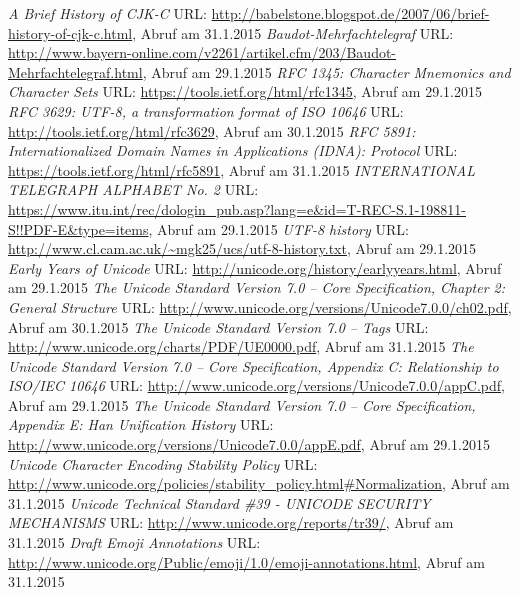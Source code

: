 \begin{thebibliography}{}
	 {\sl A Brief History of CJK-C} URL: \url{http://babelstone.blogspot.de/2007/06/brief-history-of-cjk-c.html}, Abruf am 31.1.2015
	 {\sl Baudot-Mehrfachtelegraf} URL: \url{http://www.bayern-online.com/v2261/artikel.cfm/203/Baudot-Mehrfachtelegraf.html}, Abruf am 29.1.2015
	 {\sl RFC 1345: Character Mnemonics and Character Sets} URL: \url{https://tools.ietf.org/html/rfc1345}, Abruf am 29.1.2015
	 {\sl RFC 3629: UTF-8, a transformation format of ISO 10646} URL: \url{http://tools.ietf.org/html/rfc3629}, Abruf am 30.1.2015
	 {\sl RFC 5891: Internationalized Domain Names in Applications (IDNA): Protocol} URL: \url{https://tools.ietf.org/html/rfc5891}, Abruf am 31.1.2015
	 {\sl INTERNATIONAL TELEGRAPH ALPHABET No. 2} URL: \url{https://www.itu.int/rec/dologin_pub.asp?lang=e&id=T-REC-S.1-198811-S!!PDF-E&type=items}, Abruf am 29.1.2015
	 {\sl UTF-8 history} URL: \url{http://www.cl.cam.ac.uk/~mgk25/ucs/utf-8-history.txt}, Abruf am 29.1.2015
	 {\sl Early Years of Unicode} URL: \url{http://unicode.org/history/earlyyears.html}, Abruf am 29.1.2015
	 {\sl The Unicode Standard Version 7.0 – Core Specification, Chapter 2: General Structure} URL: \url{http://www.unicode.org/versions/Unicode7.0.0/ch02.pdf}, Abruf am 30.1.2015
	 {\sl The Unicode Standard Version 7.0 – Tags} URL: \url{http://www.unicode.org/charts/PDF/UE0000.pdf}, Abruf am 31.1.2015
	 {\sl The Unicode Standard Version 7.0 – Core Specification, Appendix C: Relationship to ISO/IEC 10646} URL: \url{http://www.unicode.org/versions/Unicode7.0.0/appC.pdf}, Abruf am 29.1.2015
	 {\sl The Unicode Standard Version 7.0 – Core Specification, Appendix E: Han Unification History} URL: \url{http://www.unicode.org/versions/Unicode7.0.0/appE.pdf}, Abruf am 29.1.2015
	 {\sl Unicode Character Encoding Stability Policy} URL: \url{http://www.unicode.org/policies/stability_policy.html#Normalization}, Abruf am 31.1.2015
	 {\sl Unicode Technical Standard \#39 - UNICODE SECURITY MECHANISMS} URL: \url{http://www.unicode.org/reports/tr39/}, Abruf am 31.1.2015
	 {\sl Draft Emoji Annotations} URL: \url{http://www.unicode.org/Public/emoji/1.0/emoji-annotations.html}, Abruf am 31.1.2015

\end{thebibliography}
